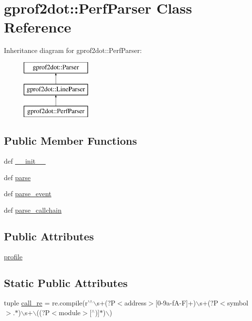 \hypertarget{classgprof2dot_1_1PerfParser}{
\section{gprof2dot::PerfParser Class Reference}
\label{classgprof2dot_1_1PerfParser}
}
Inheritance diagram for gprof2dot::PerfParser:\begin{figure}[H]
\begin{center}
\leavevmode
\includegraphics[height=3.000000cm]{classgprof2dot_1_1PerfParser}
\end{center}
\end{figure}
\subsection*{Public Member Functions}
\begin{DoxyCompactItemize}
\item 
def \hyperlink{classgprof2dot_1_1PerfParser_ad9a8aceb6ddebf85cb4814717a33e36f}{\_\-\_\-init\_\-\_\-}
\item 
def \hyperlink{classgprof2dot_1_1PerfParser_a29992f3ede194162b1403a541cfe66ed}{parse}
\item 
def \hyperlink{classgprof2dot_1_1PerfParser_a9dbfb8569cfb56cfa239a7607d742f9b}{parse\_\-event}
\item 
def \hyperlink{classgprof2dot_1_1PerfParser_a4c365c45b730a63ab9e563a297cefb05}{parse\_\-callchain}
\end{DoxyCompactItemize}
\subsection*{Public Attributes}
\begin{DoxyCompactItemize}
\item 
\hyperlink{classgprof2dot_1_1PerfParser_a43e50a541198b068aa4d4d2bfb5d3ea0}{profile}
\end{DoxyCompactItemize}
\subsection*{Static Public Attributes}
\begin{DoxyCompactItemize}
\item 
tuple \hyperlink{classgprof2dot_1_1PerfParser_a4d233c4bf5eade9c8e39234afe4a0ff2}{call\_\-re} = re.compile(r'$^\wedge$$\backslash$s+(?P$<$address$>$\mbox{[}0-\/9a-\/fA-\/F\mbox{]}+)$\backslash$s+(?P$<$symbol$>$.$\ast$)$\backslash$s+$\backslash$((?P$<$module$>$\mbox{[}$^\wedge$)\mbox{]}$\ast$)$\backslash$)
\end{DoxyCompactItemize}


